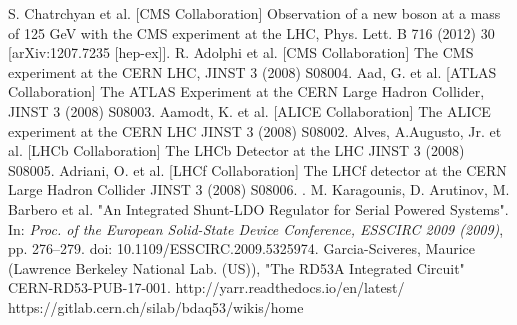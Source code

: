 \begin{thebibliography}{1}

 S. Chatrchyan et al. [CMS Collaboration] Observation of a new boson at a mass of 125 GeV with the CMS experiment at the LHC, Phys. Lett. B 716 (2012) 30 [arXiv:1207.7235 [hep-ex]].
 R. Adolphi et al. [CMS Collaboration] The CMS experiment at the CERN LHC,
JINST 3 (2008) S08004.
Aad, G. et al. [ATLAS Collaboration] The ATLAS Experiment at the CERN Large
Hadron Collider, JINST 3 (2008) S08003. 
Aamodt, K. et al. [ALICE Collaboration] The ALICE experiment at the CERN
LHC JINST 3 (2008) S08002.
Alves, A.Augusto, Jr. et al. [LHCb Collaboration] The LHCb Detector at the LHC
JINST 3 (2008) S08005.
Adriani, O. et al. [LHCf Collaboration] The LHCf detector at the CERN Large
Hadron Collider JINST 3 (2008) S08006.
.
 M. Karagounis, D. Arutinov, M. Barbero et al. "An Integrated Shunt-LDO Regulator
for Serial Powered Systems". In: \textit{Proc. of the European Solid-State Device Conference,
ESSCIRC 2009 (2009)}, pp. 276–279. doi: 10.1109/ESSCIRC.2009.5325974.
 Garcia-Sciveres, Maurice (Lawrence Berkeley National Lab. (US)), "The RD53A Integrated Circuit" CERN-RD53-PUB-17-001.
 http://yarr.readthedocs.io/en/latest/
 https://gitlab.cern.ch/silab/bdaq53/wikis/home
\end{thebibliography}